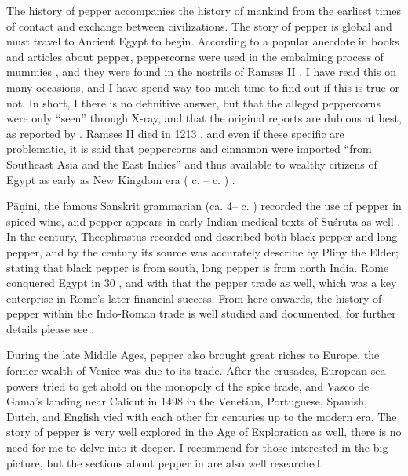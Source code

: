 The history of pepper accompanies the history of mankind from the earliest times of contact and exchange between civilizations. The story of pepper is global and must travel to Ancient Egypt to begin. According to a popular anecdote in books and articles about pepper, peppercorns were used in the embalming process of mummies \autocite{ravindran_black_2000}, and they were found in the nostrils of Ramses II \autocite[168]{turner_spice_2004}. I have read this on many occasions, and I have spend way too much time to find out if this is true or not. In short, I there is no definitive answer, but that the alleged peppercorns were only ``seen'' through X-ray, and that the original reports are dubious at best, as reported by \textcite[206]{bucaille_mummies_1990}. Ramses II died in 1213 \BC{}, and even if these specific are problematic, it is said that peppercorns and cinnamon were imported ``from Southeast Asia and the East Indies'' and thus available to wealthy citizens of Egypt as early as New Kingdom era ( c. \BC{}-- c. \BC{}) \autocite[394]{salima_diet_2005}.

Pāṇini, the famous Sanskrit grammarian (ca. 4-- c. \BC{}) recorded the use of pepper in spiced wine, and pepper appears in early Indian medical texts of Suśruta as well \autocite{ravindran_black_2000}. In the  century, Theophrastus recorded and described both black pepper and long pepper, and by the  century \AD{} its source was accurately describe by Pliny the Elder; stating that black pepper is from south, long pepper is from north India. Rome conquered Egypt in 30 \BC, and with that the pepper trade as well, which was a key enterprise in Rome's later financial success. From here onwards, the history of pepper within the Indo-Roman trade is well studied and documented, for further details please see \textcite{sidebotham_berenike_2011,de_romanis_indo-roman_2020,miller_spice_1969}. 


During the late Middle Ages, pepper also brought great riches to Europe, the former wealth of Venice was due to its trade. After the crusades, European sea powers tried to get ahold on the monopoly of the spice trade, and Vasco de Gama's landing near Calicut in 1498 in the Venetian, Portuguese, Spanish, Dutch, and English vied with each other for centuries up to the modern era. The story of pepper is very well explored in the Age of Exploration as well, there is no need for me to delve into it deeper. I recommend \textcite{shaffer_pepper_2013} for those interested in the big picture, but the sections about pepper in \textcite{dalby_dangerous_2000,turner_spice_2004} are also well researched.

